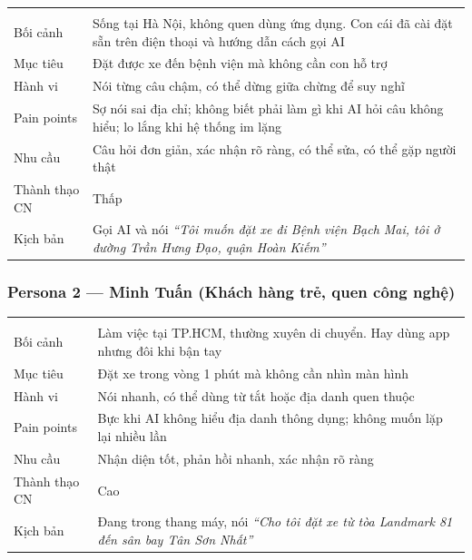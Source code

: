 \documentclass[12pt,a4paper]{article}
\begin{document}
\begin{longtable}{L{3.5cm} L{10cm}}
  \toprule{}\\
  \midrule\endfirsthead\toprule{}\\\midrule\endhead\bottomrule\endlastfoot
  Bối cảnh & Sống tại Hà Nội, không quen dùng ứng dụng. Con cái đã cài đặt sẵn trên điện thoại và hướng dẫn cách gọi AI \\
  Mục tiêu & Đặt được xe đến bệnh viện mà không cần con hỗ trợ \\
  Hành vi & Nói từng câu chậm, có thể dừng giữa chừng để suy nghĩ \\
  Pain points & Sợ nói sai địa chỉ; không biết phải làm gì khi AI hỏi câu không hiểu; lo lắng khi hệ thống im lặng \\
  Nhu cầu & Câu hỏi đơn giản, xác nhận rõ ràng, có thể sửa, có thể gặp người thật \\
  Thành thạo CN & Thấp \\
  Kịch bản & Gọi AI và nói \textit{``Tôi muốn đặt xe đi Bệnh viện Bạch Mai, tôi ở đường Trần Hưng Đạo, quận Hoàn Kiếm''} \\
\end{longtable}

\subsubsection{Persona 2 --- Minh Tuấn (Khách hàng trẻ, quen công nghệ)}

\begin{longtable}{L{3.5cm} L{10cm}}
  \toprule{}\\
  \midrule\endfirsthead\toprule{}\\\midrule\endhead\bottomrule\endlastfoot
  Bối cảnh & Làm việc tại TP.HCM, thường xuyên di chuyển. Hay dùng app nhưng đôi khi bận tay \\
  Mục tiêu & Đặt xe trong vòng 1 phút mà không cần nhìn màn hình \\
  Hành vi & Nói nhanh, có thể dùng từ tắt hoặc địa danh quen thuộc \\
  Pain points & Bực khi AI không hiểu địa danh thông dụng; không muốn lặp lại nhiều lần \\
  Nhu cầu & Nhận diện tốt, phản hồi nhanh, xác nhận rõ ràng \\
  Thành thạo CN & Cao \\
  Kịch bản & Đang trong thang máy, nói \textit{``Cho tôi đặt xe từ tòa Landmark 81 đến sân bay Tân Sơn Nhất''} \\
\end{longtable}
\end{document}
